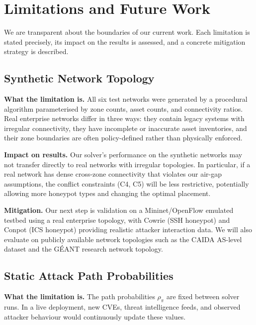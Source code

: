 \documentclass[journal]{IEEEtran}
\begin{document}
\section{Limitations and Future Work}
\label{sec:discussion}

We are transparent about the boundaries of our current
work.
Each limitation is stated precisely, its impact on the
results is assessed, and a concrete mitigation strategy is
described.

\subsection{Synthetic Network Topology}

\textbf{What the limitation is.}
All six test networks were generated by a procedural
algorithm parameterised by zone counts, asset counts, and
connectivity ratios.
Real enterprise networks differ in three ways: they contain
legacy systems with irregular connectivity, they have
incomplete or inaccurate asset inventories, and their zone
boundaries are often policy-defined rather than
physically enforced.

\textbf{Impact on results.}
Our solver's performance on the synthetic networks may not
transfer directly to real networks with irregular
topologies.
In particular, if a real network has dense cross-zone
connectivity that violates our air-gap assumptions, the
conflict constraints (C4, C5) will be less restrictive,
potentially allowing more honeypot types and changing the
optimal placement.

\textbf{Mitigation.}
Our next step is validation on a Mininet/OpenFlow emulated
testbed using a real enterprise topology, with Cowrie
(SSH honeypot) and Conpot (ICS honeypot) providing
realistic attacker interaction data.
We will also evaluate on publicly available network
topologies such as the CAIDA AS-level dataset and the
GÉANT research network topology.

\subsection{Static Attack Path Probabilities}

\textbf{What the limitation is.}
The path probabilities $\rho_\pi$ are fixed between solver
runs.
In a live deployment, new CVEs, threat intelligence feeds,
and observed attacker behaviour would continuously update
these values.
\end{document}
